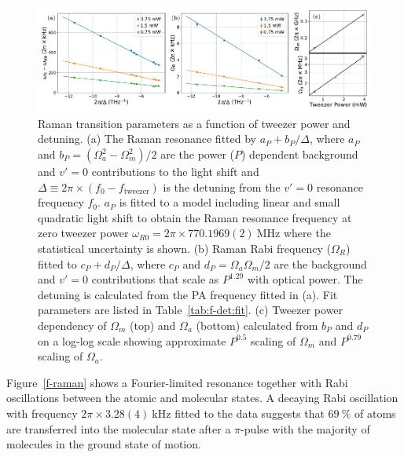\documentclass[aps,prl,twocolumn,10pt,superscriptaddress]{revtex4-1}
\newcommand{\paren}[1]{{\left({#1}\right)}}
\newcommand{\todo}[1]{}
\begin{document}
\begin{figure}[t!]
  \includegraphics[width=\textwidth]{imgs/fig-det.pdf}
  \caption{Raman transition parameters as a function of tweezer power and detuning.
    (a) The Raman resonance fitted by $a_P+b_P/\Delta$, where
    $a_P$ and $b_P=(\Omega_a^2-\Omega_m^2)/2$
    are the power ($P$) dependent background and $v'=0$ contributions
    to the light shift and
    $\Delta\equiv2\pi\times\paren{f_0 - f_{\mathrm{tweezer}}}$ is the detuning from
    the $v'=0$ resonance frequency $f_0$.
    $a_P$ is fitted to a model including linear and small quadratic light shift
    \todo{which assumes $\Omega_m\gg\Omega_a$} to obtain the Raman resonance frequency
    at zero tweezer power $\omega_{R0}=2\pi\times770.1969(2)~\mathrm{MHz}$ where the statistical uncertainty is shown.
    (b) Raman Rabi frequency ($\Omega_R$) fitted to $c_P+d_P/\Delta$, where
    $c_P$ and $d_P=\Omega_a\Omega_m/2$
    are the background and $v'=0$ contributions that scale as $P^{1.29}$ with optical power.
    The detuning is calculated from the PA frequency fitted in (a). Fit parameters are listed in Table~\ref{tab:f-det:fit}.
    (c) Tweezer power dependency of $\Omega_m$ (top) and $\Omega_a$ (bottom) calculated from
    $b_P$ and $d_P$ on a log-log scale showing approximate $P^{0.5}$ scaling of $\Omega_m$ and
    $P^{0.79}$ scaling of $\Omega_a$.
    \label{f-det}}
\end{figure}

Figure~\ref{f-raman} shows a Fourier-limited resonance together with Rabi oscillations between the atomic and molecular states.
A decaying Rabi oscillation with frequency $2\pi\times3.28(4)~\mathrm{kHz}$ fitted to the data suggests that
$69~\mathrm{\%}$ of atoms are transferred into the molecular state after a $\pi$-pulse with the majority of molecules in the ground state of motion.
\end{document}
